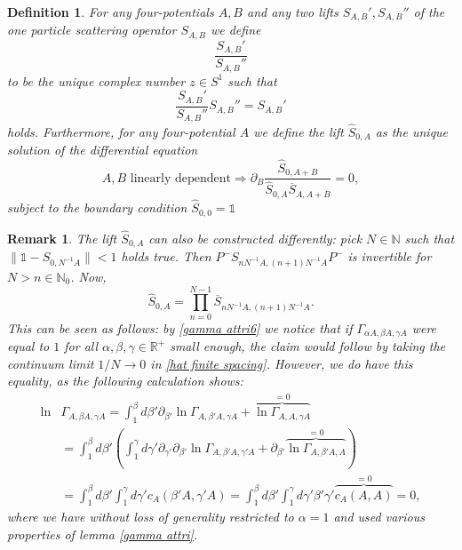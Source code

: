 \documentclass[a4paper,11pt]{article}
\newtheorem{de}{Definition}
\newtheorem{rmk}{Remark}
\begin{document}
\begin{de}
For any four-potentials \(A,B\) and any two lifts \(S_{A,B}', S_{A,B}''\) of the one particle scattering operator \(S_{A,B}\)
we define
\begin{equation}
\frac{S_{A,B}'}{S_{A,B}''}
\end{equation}
to be the unique complex number \(z\in S^1\) such that 
\begin{equation}
\frac{S_{A,B}'}{S_{A,B}''} S_{A,B}'' = S_{A,B}'
\end{equation}
holds.
Furthermore, for any four-potential \(A\) we define the lift \(\hat{S}_{0,A}\) as the unique solution of the differential equation
\begin{equation}\label{def s hat}
A,B\text{ linearly dependent}\Rightarrow \partial_B \frac{\hat{S}_{0,A+B}}{\hat{S}_{0,A}\overline{S}_{A,A+B}}=0,
\end{equation}
subject to the boundary condition \(\hat{S}_{0,0}=\mathds{1}\)
\end{de}
\begin{rmk}
The lift \(\hat{S}_{0,A}\) can also be constructed differently: pick \(N\in\mathbb{N}\) such that \(\|\mathds{1}-S_{0,N^{-1}A}\|<1\) holds true. 
Then \(P^-S_{n N^{-1} A,(n+1)N^{-1} A}P^-\) is invertible for \(N>n\in \mathbb{N}_0\).
Now, 
\begin{equation}\label{hat finite spacing}
\hat{S}_{0,A}=\prod_{n=0}^{N-1} \overline{S}_{n N^{-1} A,(n+1)N^{-1} A}.
\end{equation}
This can be seen as follows: by \eqref{gamma attri6} we notice that if \(\Gamma_{\alpha A, \beta A, \gamma A}\) were equal to \(1\) 
for all \(\alpha,\beta,\gamma\in \mathbb{R}^+\)
small enough,
the claim would follow by taking the continuum limit \(1/N\rightarrow 0\) in \eqref{hat finite spacing}. However, we do have this equality, as
the following calculation shows:
\begin{align}
\ln &\Gamma_{A,\beta A, \gamma A} = \int_1^\beta d \beta' \partial_{\beta'}\ln \Gamma_{A,\beta' A, \gamma A} + \overbrace{\ln \Gamma_{A,A,\gamma A}}^{=0}\\
&= \int_1^\beta d\beta' \left(\int_1^\gamma d\gamma' \partial_{\gamma'}\partial_{\beta'} \ln \Gamma_{A,\beta' A, \gamma' A} 
+ \partial_{\beta'} \overbrace{\ln \Gamma_{A,\beta' A, A}}^{=0} \right)\\
&=\int_1^\beta d\beta' \int_1^\gamma d\gamma' c_A(\beta' A, \gamma' A)
=\int_1^\beta d\beta' \int_1^\gamma d\gamma'  \beta' \gamma' \overbrace{c_A( A,  A) }^{=0}=0,
\end{align}
where we have without loss of generality restricted to \(\alpha =1\) and used various properties of lemma \ref{gamma attri}.
\end{rmk}
\end{document}

